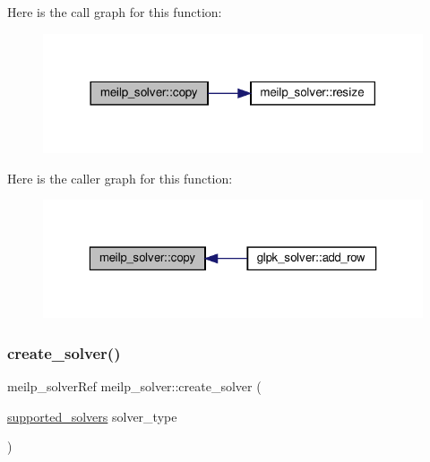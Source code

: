 Here is the call graph for this function\+:
\nopagebreak
\begin{figure}[H]
\begin{center}
\leavevmode
\includegraphics[width=318pt]{dc/d7f/classmeilp__solver_a94b27ed47dbe2872cfc119df010dbc7d_cgraph}
\end{center}
\end{figure}
Here is the caller graph for this function\+:
\nopagebreak
\begin{figure}[H]
\begin{center}
\leavevmode
\includegraphics[width=323pt]{dc/d7f/classmeilp__solver_a94b27ed47dbe2872cfc119df010dbc7d_icgraph}
\end{center}
\end{figure}
\mbox{\label{classmeilp__solver_a77048480479b25895144987d41b9098b}} 
\subsubsection{\texorpdfstring{create\+\_\+solver()}{create\_solver()}}
{\footnotesize\ttfamily meilp\+\_\+solver\+Ref meilp\+\_\+solver\+::create\+\_\+solver (\begin{DoxyParamCaption}\item[{\hyperlink{classmeilp__solver_ac258f0ae8866c02ac01796f22db67b7a}{supported\+\_\+solvers}}]{solver\+\_\+type }\end{DoxyParamCaption})\hspace{0.3cm}{\ttfamily [static]}}



